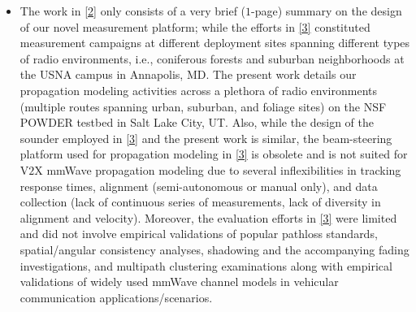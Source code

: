 \documentclass[12pt, draftcls, onecolumn]{IEEEtran}
\begin{document}
\begin{itemize}
    \item The work in \ref{2} only consists of a very brief ($1$-page) summary on the design of our novel measurement platform; while the efforts in \ref{3} constituted measurement campaigns at different deployment sites spanning different types of radio environments, i.e., coniferous forests and suburban neighborhoods at the USNA campus in Annapolis, MD. The present work details our propagation modeling activities across a plethora of radio environments (multiple routes spanning urban, suburban, and foliage sites) on the NSF POWDER testbed in Salt Lake City, UT. Also, while the design of the sounder employed in \ref{3} and the present work is similar, the beam-steering platform used for propagation modeling in \ref{3} is obsolete and is not suited for V$2$X mmWave propagation modeling due to several inflexibilities in tracking response times, alignment (semi-autonomous or manual only), and data collection (lack of continuous series of measurements, lack of diversity in alignment and velocity). Moreover, the evaluation efforts in \ref{3} were limited and did not involve empirical validations of popular pathloss standards, spatial/angular consistency analyses, shadowing and the accompanying fading investigations, and multipath clustering examinations along with empirical validations of widely used mmWave channel models in vehicular communication applications/scenarios.
\end{itemize}
\end{document}
